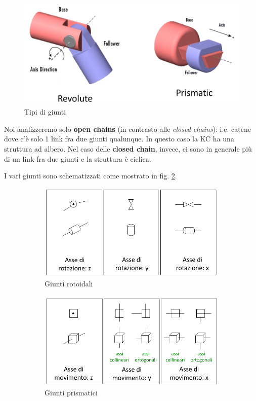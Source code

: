 \begin{figure}
	\centering
	\includegraphics[width=0.6\linewidth]{images/kinematic_chains_2}
	\caption{Tipi di giunti}
	\label{fig:kinematicchains2}
\end{figure}

Noi analizzeremo solo \textbf{open chains} (in contrasto alle \textit{closed chains}): i.e. catene dove c'è solo 1 link fra due giunti qualunque. In questo caso la KC ha una struttura ad albero. Nel caso delle \textbf{closed chain}, invece, ci sono in generale più di un link fra due giunti e la struttura è ciclica.

I vari giunti sono schematizzati come mostrato in fig. \ref{fig:kinematicchains3}.

\begin{figure}[H]
	\begin{subfigure}{\linewidth}
		\centering
		\includegraphics[width=0.6\linewidth]{images/kinematic_chains_3}
		\caption{Giunti rotoidali}
	\end{subfigure}
	\begin{subfigure}{\linewidth}
		\centering
		\includegraphics[width=0.6\linewidth]{images/kinematic_chains_4}
		\caption{Giunti prismatici}
	\end{subfigure}
	\caption{}
	\label{fig:kinematicchains3}
\end{figure}





